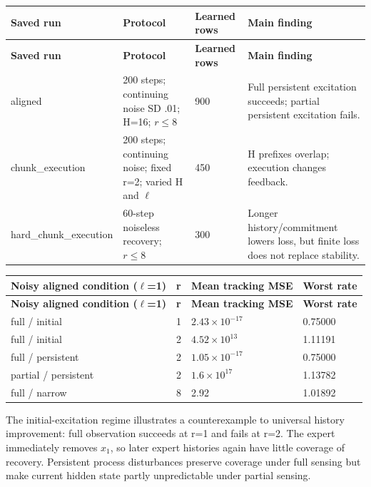 \documentclass{l4dc2026}
\begin{document}
{\small\setlength{\tabcolsep}{3pt}
\begin{longtable}{@{}p{}p{}p{}p{}@{}}
\toprule
\textbf{Saved run} & \textbf{Protocol} & \textbf{Learned rows} & \textbf{Main finding} \\
\midrule\endfirsthead
\toprule
\textbf{Saved run} & \textbf{Protocol} & \textbf{Learned rows} & \textbf{Main finding} \\
\midrule\endhead
\bottomrule\endfoot
aligned & 200 steps; continuing noise SD .01; H=16; $r\leq8$ & 900 & Full persistent excitation succeeds; partial persistent excitation fails. \\
chunk\_execution & 200 steps; continuing noise; fixed r=2; varied H and $\ell$ & 450 & H prefixes overlap; execution changes feedback. \\
hard\_chunk\_execution & 60-step noiseless recovery; $r\leq8$ & 300 & Longer history/commitment lowers loss, but finite loss does not replace stability. \\
\end{longtable}}

{\small\setlength{\tabcolsep}{3pt}
\begin{longtable}{@{}p{}p{}p{}p{}@{}}
\toprule
\textbf{Noisy aligned condition ($\ell$=1)} & \textbf{r} & \textbf{Mean tracking MSE} & \textbf{Worst rate} \\
\midrule\endfirsthead
\toprule
\textbf{Noisy aligned condition ($\ell$=1)} & \textbf{r} & \textbf{Mean tracking MSE} & \textbf{Worst rate} \\
\midrule\endhead
\bottomrule\endfoot
full / initial & 1 & $2.43\times10^{-17}$ & 0.75000 \\
full / initial & 2 & $4.52\times10^{13}$ & 1.11191 \\
full / persistent & 2 & $1.05\times10^{-17}$ & 0.75000 \\
partial / persistent & 2 & $1.6\times10^{17}$ & 1.13782 \\
full / narrow & 8 & 2.92 & 1.01892 \\
\end{longtable}}

The initial-excitation regime illustrates a counterexample to universal history improvement: full observation succeeds at r=1 and fails at r=2. The expert immediately removes $x_1$, so later expert histories again have little coverage of recovery. Persistent process disturbances preserve coverage under full sensing but make current hidden state partly unpredictable under partial sensing.
\end{document}
